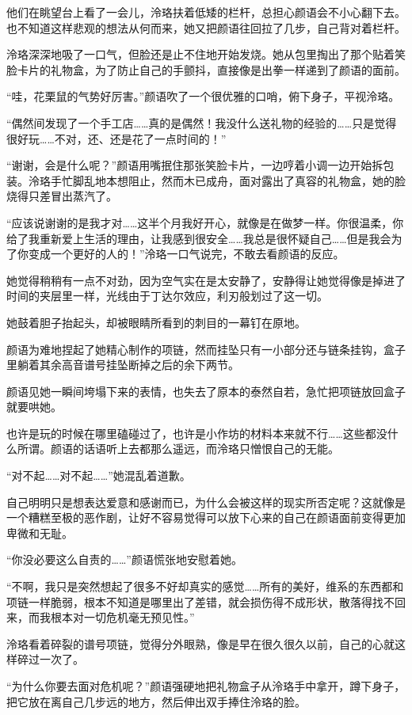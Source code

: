 \documentclass[UTF8, scheme = chinese, openany]{ctexbook}
\begin{document}
他们在眺望台上看了一会儿，泠珞扶着低矮的栏杆，总担心颜语会不小心翻下去。也不知道这样悲观的想法从何而来，她又把颜语往回拉了几步，自己背对着栏杆。

泠珞深深地吸了一口气，但脸还是止不住地开始发烧。她从包里掏出了那个贴着笑脸卡片的礼物盒，为了防止自己的手颤抖，直接像是出拳一样递到了颜语的面前。

“哇，花栗鼠的气势好厉害。”颜语吹了一个很优雅的口哨，俯下身子，平视泠珞。

“偶然间发现了一个手工店……真的是偶然！我没什么送礼物的经验的……只是觉得很好玩……不对，还、还是花了一点时间的！”

“谢谢，会是什么呢？”颜语用嘴抿住那张笑脸卡片，一边哼着小调一边开始拆包装。泠珞手忙脚乱地本想阻止，然而木已成舟，面对露出了真容的礼物盒，她的脸烧得只差冒出蒸汽了。

“应该说谢谢的是我才对……这半个月我好开心，就像是在做梦一样。你很温柔，你给了我重新爱上生活的理由，让我感到很安全……我总是很怀疑自己……但是我会为了你变成一个更好的人的！”泠珞一口气说完，不敢去看颜语的反应。

她觉得稍稍有一点不对劲，因为空气实在是太安静了，安静得让她觉得像是掉进了时间的夹层里一样，光线由于丁达尔效应，利刃般划过了这一切。

她鼓着胆子抬起头，却被眼睛所看到的刺目的一幕钉在原地。

颜语为难地捏起了她精心制作的项链，然而挂坠只有一小部分还与链条挂钩，盒子里躺着其余高音谱号挂坠断掉之后的余下两节。

颜语见她一瞬间垮塌下来的表情，也失去了原本的泰然自若，急忙把项链放回盒子就要哄她。

也许是玩的时候在哪里磕碰过了，也许是小作坊的材料本来就不行……这些都没什么所谓。颜语的话语听上去都那么遥远，而泠珞只憎恨自己的无能。

“对不起……对不起……”她混乱着道歉。

自己明明只是想表达爱意和感谢而已，为什么会被这样的现实所否定呢？这就像是一个糟糕至极的恶作剧，让好不容易觉得可以放下心来的自己在颜语面前变得更加卑微和无耻。

“你没必要这么自责的……”颜语慌张地安慰着她。

“不啊，我只是突然想起了很多不好却真实的感觉……所有的美好，维系的东西都和项链一样脆弱，根本不知道是哪里出了差错，就会损伤得不成形状，散落得找不回来，而我根本对一切危机毫无预见性。”

泠珞看着碎裂的谱号项链，觉得分外眼熟，像是早在很久很久以前，自己的心就这样碎过一次了。

“为什么你要去面对危机呢？”颜语强硬地把礼物盒子从泠珞手中拿开，蹲下身子，把它放在离自己几步远的地方，然后伸出双手捧住泠珞的脸。
\end{document}
